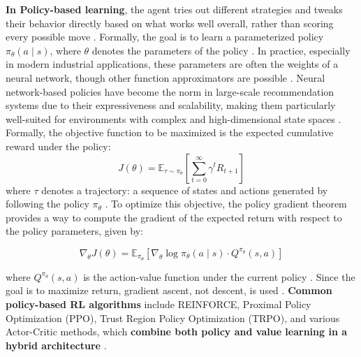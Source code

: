 \documentclass[final]{anthology-ch}         %
\begin{document}
\textbf{In Policy-based learning}, the agent tries out different strategies and tweaks their behavior directly based on what works well overall, rather than scoring every possible move \cite{russell2016artificial, Sutton1998}. Formally, the goal is to learn a parameterized policy \( \pi_\theta(a \mid s) \), where \( \theta \) denotes the parameters of the policy \cite{Sutton1998, schulman2017proximal}. In practice, especially in modern industrial applications, these parameters are often the weights of a neural network, though other function approximators are possible \cite{Sutton1998, levine2020offline, mnih2016asynchronous}. Neural network-based policies have become the norm in large-scale recommendation systems due to their expressiveness and scalability, making them particularly well-suited for environments with complex and high-dimensional state spaces \cite{lin2023survey, chen2022off, gauci2018horizon}. Formally, the objective function to be maximized is the expected cumulative reward under the policy: 
\begin{equation}
    J(\theta) = \mathbb{E}_{\tau \sim \pi_\theta} \left[ \sum_{t=0}^{\infty} \gamma^t R_{t+1} \right]
    \label{eq:objective_function}
\end{equation}
where \( \tau \) denotes a trajectory: a sequence of states and actions generated by following the policy \( \pi_\theta \) \cite{Sutton1998, levine2020offline}. To optimize this objective, the policy gradient theorem provides a way to compute the gradient of the expected return with respect to the policy parameters, given by:

\begin{equation}
    \nabla_\theta J(\theta) = \mathbb{E}_{\pi_\theta} \left[ \nabla_\theta \log \pi_\theta(a \mid s) \cdot Q^{\pi_\theta}(s, a) \right]
    \label{eq:policy_gradient}
\end{equation}

where \( Q^{\pi_\theta}(s, a) \) is the action-value function under the current policy \cite{Sutton1998, williams1992simple}. Since the goal is to maximize return, gradient ascent, not descent, is used \cite{Sutton1998, williams1992simple}. \textbf{Common policy-based RL algorithms }include REINFORCE, Proximal Policy Optimization (PPO), Trust Region Policy Optimization (TRPO), and various Actor-Critic methods, which \textbf{combine both policy and value learning in a hybrid architecture} \cite{williams1992simple, schulman2015trust, schulman2017proximal, Sutton1998}.
\end{document}

